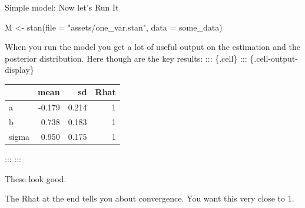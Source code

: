 \documentclass[
  11pt,
  ignorenonframetext,
]{beamer}
\newenvironment{Shaded}{\begin{snugshade}}{\end{snugshade}}
\newcommand{\AttributeTok}[1]{\textcolor[rgb]{0.40,0.45,0.13}{#1}}
\newcommand{\FunctionTok}[1]{\textcolor[rgb]{0.28,0.35,0.67}{#1}}
\newcommand{\NormalTok}[1]{\textcolor[rgb]{0.00,0.23,0.31}{#1}}
\newcommand{\OtherTok}[1]{\textcolor[rgb]{0.00,0.23,0.31}{#1}}
\newcommand{\StringTok}[1]{\textcolor[rgb]{0.13,0.47,0.30}{#1}}
\begin{document}
\begin{frame}[fragile]{Simple model: Now let's Run It}
\protect\hypertarget{simple-model-now-lets-run-it}{}
\begin{Shaded}
\begin{Highlighting}[]
\NormalTok{M }\OtherTok{\textless{}{-}} \FunctionTok{stan}\NormalTok{(}\AttributeTok{file =} \StringTok{"assets/one\_var.stan"}\NormalTok{, }
          \AttributeTok{data =}\NormalTok{ some\_data)}
\end{Highlighting}
\end{Shaded}

When you run the model you get a lot of useful output on the estimation
and the posterior distribution. Here though are the key results: :::
\{.cell\} ::: \{.cell-output-display\}

\begin{tabular}{l|r|r|r}
\hline
  & mean & sd & Rhat\\
\hline
a & -0.179 & 0.214 & 1\\
\hline
b & 0.738 & 0.183 & 1\\
\hline
sigma & 0.950 & 0.175 & 1\\
\hline
\end{tabular}

::: :::

These look good.

The Rhat at the end tells you about convergence. You want this very
close to 1.
\end{frame}
\end{document}
